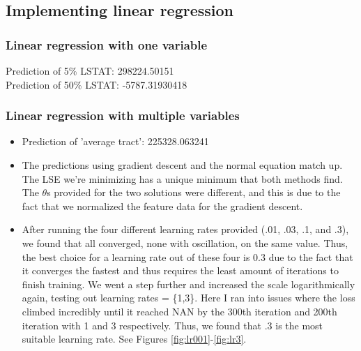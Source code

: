 \documentclass[pdftex,11pt]{article}
\begin{document}
\subsection{Implementing linear regression}
\subsubsection{Linear regression with one variable}
Prediction of 5\% LSTAT: 298224.50151\\
Prediction of 50\% LSTAT: -5787.31930418

\subsubsection{Linear regression with multiple variables}
\begin{itemize}
\item Prediction of 'average tract': 225328.063241
\item The predictions using gradient descent and the normal equation match up. The LSE we're minimizing has a unique minimum that both methods find. The $\theta$s provided for the two solutions were different, and this is due to the fact that we normalized the feature data for the gradient descent.
\item After running the four different learning rates provided (.01, .03, .1, and .3), we found that all converged, none with oscillation, on the same value. Thus, the best choice for a learning rate out of these four is 0.3 due to the fact that it converges the fastest and thus requires the least amount of iterations to finish training. We went a step further and increased the scale logarithmically again, testing out learning rates = \{1,3\}. Here I ran into issues where the loss climbed incredibly until it reached NAN by the 300th iteration and 200th iteration with 1 and 3 respectively. Thus, we found that .3 is the most suitable learning rate. See Figures \ref{fig:lr001}-\ref{fig:lr3}.
\end{itemize}
\end{document}
